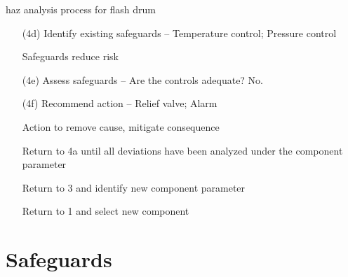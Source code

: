 \documentclass[aspectratio=1610,pdftex,dvipsnames,compress,xcolor={dvipsnames}]{beamer}
\newcommand{\acs}{\acrshort} %
\begin{document}
\begin{frame}{\acs{haz} analysis process for flash drum}
    \begin{enumerate}[series=outerlist,topsep=0pt,itemsep=1pt,leftmargin=*,label=(\arabic*)]
        \item[(4d)]Identify existing safeguards -- Temperature control; Pressure control 
        \item[]Safeguards reduce risk
            \vspace{0.15in}
        \item[(4e)]Assess safeguards -- Are the controls adequate? No.
            \vspace{0.15in}
        \item[(4f)]Recommend action -- Relief valve; Alarm
        \item[]Action to remove cause, mitigate consequence
            \vspace{0.15in}
        \item[]Return to 4a until all deviations have been analyzed under the component parameter
            \vspace{0.15in}
        \item[]Return to 3 and identify new component parameter
            \vspace{0.15in}
        \item[]Return to 1 and select new component
    \end{enumerate}
\end{frame}


\section{Safeguards}
\end{document}

